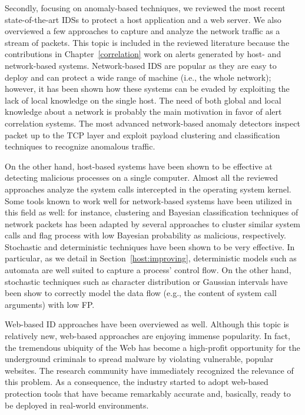 Secondly, focusing on anomaly-based techniques, we reviewed the most
recent state-of-the-art \acp{IDS} to protect a host
application and a web server. We also overviewed a few approaches to
capture and analyze the network traffic as a stream of packets. This
topic is included in the reviewed literature because the contributions
in Chapter~\ref{correlation} work on alerts generated by host- and
network-based systems. Network-based \ac{IDS} are popular as they are
easy to deploy and can protect a wide range of machine (i.e., the
whole network); however, it has been shown how these systems can be
evaded by exploiting the lack of local knowledge on the single
host. The need of both global and local knowledge about a network is
probably the main motivation in favor of alert correlation
systems. The most advanced network-based anomaly detectors inspect
packet up to the \ac{TCP} layer and exploit payload clustering and
classification techniques to recognize anomalous traffic.

On the other hand, host-based systems have been shown to be effective
at detecting malicious processes on a single computer. Almost all the
reviewed approaches analyze the system calls intercepted in the
operating system kernel. Some tools known to work well for
network-based systems have been utilized in this field as well: for
instance, clustering and Bayesian classification techniques of network
packets has been adapted by several approaches to cluster similar
system calls and flag process with low Bayesian probability as
malicious, respectively. Stochastic and deterministic techniques have
been shown to be very effective. In particular, as we detail in
Section~\ref{host:improving}, deterministic models such as automata
are well suited to capture a process' control flow. On the other hand,
stochastic techniques such as character distribution or Gaussian
intervals have been show to correctly model the data flow (e.g., the
content of system call arguments) with low \ac{FP}.

Web-based \ac{ID} approaches have been overviewed as well. Although
this topic is relatively new, web-based approaches are enjoying
immense popularity. In fact, the tremendous ubiquity of the Web has
become a high-profit opportunity for the underground criminals to
spread malware by violating vulnerable, popular websites. The research
community have immediately recognized the relevance of this
problem. As a consequence, the industry started to adopt web-based
protection tools that have became remarkably accurate and, basically,
ready to be deployed in real-world environments.

